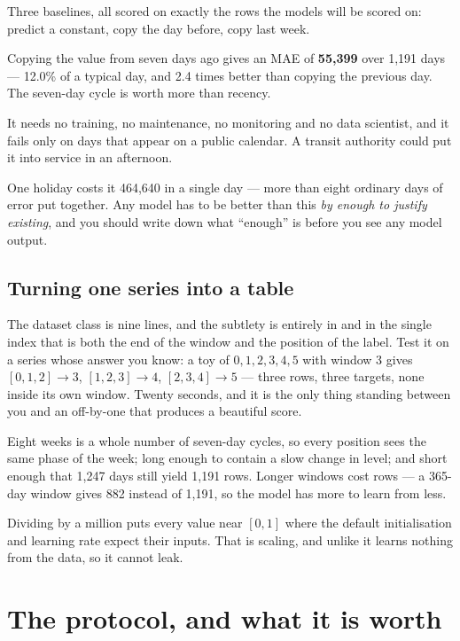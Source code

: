 \documentclass[11pt,a4paper]{article}
\begin{document}
Three baselines, all scored on exactly the rows the models will be scored on:
predict a constant, copy the day before, copy last week.

\begin{keybox}[title={The number to beat}]
Copying the value from seven days ago gives an MAE of \textbf{55{,}399} over
1{,}191 days --- 12.0\% of a typical day, and 2.4 times better than copying the
previous day. The seven-day cycle is worth more than recency.

It needs no training, no maintenance, no monitoring and no data scientist, and
it fails only on days that appear on a public calendar. A transit authority
could put it into service in an afternoon.
\end{keybox}

One holiday costs it 464{,}640 in a single day --- more than eight ordinary
days of error put together. Any model has to be better than this \emph{by
enough to justify existing}, and you should write down what ``enough'' is
before you see any model output.

\subsection{Turning one series into a table}

The dataset class is nine lines, and the subtlety is entirely in
 and in the single index that is both the end of the window
and the position of the label. Test it on a series whose answer you know: a toy
of $0,1,2,3,4,5$ with window 3 gives $[0,1,2] \to 3$, $[1,2,3] \to 4$,
$[2,3,4] \to 5$ --- three rows, three targets, none inside its own window.
Twenty seconds, and it is the only thing standing between you and an off-by-one
that produces a beautiful score.

Eight weeks is a whole number of seven-day cycles, so every position sees the
same phase of the week; long enough to contain a slow change in level; and
short enough that 1{,}247 days still yield 1{,}191 rows. Longer windows cost
rows --- a 365-day window gives 882 instead of 1{,}191, so the model has more
to learn from less.

Dividing by a million puts every value near $[0,1]$ where the default
initialisation and learning rate expect their inputs. That is scaling, and
unlike  it learns nothing from the data, so it cannot
leak.

\section{The protocol, and what it is worth}
\end{document}
